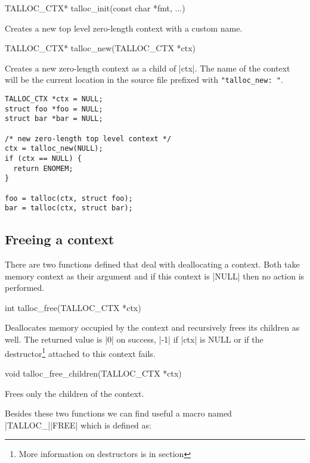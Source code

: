 \begin{funcproto}
TALLOC_CTX* talloc_init(const char *fmt, ...)
\end{funcproto}
\begin{funcdesc}
Creates a new top level zero-length context with a custom name.
\end{funcdesc}
\begin{funcproto}
TALLOC_CTX* talloc_new(TALLOC_CTX *ctx)
\end{funcproto}
\begin{funcdesc}
Creates a new zero-length context as a child of |ctx|. The name of the context
will be the current location in the source file prefixed with
\lstinline[showspaces=true]{"talloc_new: "}.
\end{funcdesc}

\begin{lstlisting}[caption={talloc_new()},label=lst:talloc_new]
TALLOC_CTX *ctx = NULL;
struct foo *foo = NULL;
struct bar *bar = NULL;

/* new zero-length top level context */
ctx = talloc_new(NULL);
if (ctx == NULL) {
  return ENOMEM;
}

foo = talloc(ctx, struct foo);
bar = talloc(ctx, struct bar);
\end{lstlisting}

\subsection{Freeing a context}
\label{talloc:subsec:free-context}

There are two functions defined that deal with deallocating a context. Both
take memory context as their argument and if this context is |NULL| then no
action is performed.

\begin{funcproto}
int talloc_free(TALLOC_CTX *ctx)
\end{funcproto}
\begin{funcdesc}
  Deallocates memory occupied by the context and recursively frees its 
  children as well. The returned value is |0| on success, |-1| if |ctx| is NULL
  or if the destructor\footnote{More information on destructors is in section
  } attached to this context fails.
\end{funcdesc}
\begin{funcproto}
void talloc_free_children(TALLOC_CTX *ctx)
\end{funcproto}
\begin{funcdesc}
  Frees only the children of the context.
\end{funcdesc}
\funclistend
Besides these two functions we can find useful a macro named |TALLOC_||FREE|
which is defined as:

